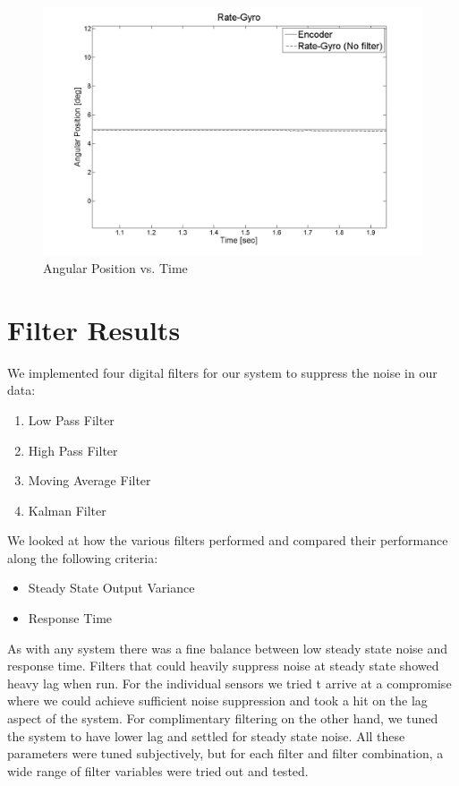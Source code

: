 \documentclass{article}
\theoremstyle{plain}
\theoremstyle{definition}
\theoremstyle{remark}
\begin{document}
\begin{figure}[hbt]
\begin{center}
\includegraphics[width = 13cm]{Gyro_Peak2peak.png}
\caption{Angular Position vs. Time}
\label{Gyro_Peak2peak}
\end{center}
\end{figure}

\clearpage

\section{Filter Results}
We implemented four digital filters for our system to suppress the noise in our data:
\begin{enumerate}
\item Low Pass Filter
\item High Pass Filter
\item Moving Average Filter
\item Kalman Filter
\end{enumerate}
We looked at how the various filters performed and compared their performance along the following criteria:
\begin{itemize}
\item Steady State Output Variance

\item Response Time
\end{itemize}
As with any system there was a fine balance between low steady state noise and response time. Filters that could heavily suppress noise at steady state showed heavy lag when run. For the individual sensors we tried t arrive at a compromise where we could achieve sufficient noise suppression and took a hit on the lag aspect of the system. For complimentary filtering on the other hand, we tuned the system to have lower lag and settled for steady state noise. All these parameters were tuned subjectively, but for each filter and filter combination, a wide range of filter variables were tried out and tested.\\
\end{document}

